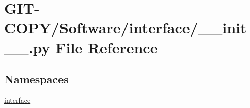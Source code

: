 \hypertarget{GIT-COPY_2Software_2interface_2____init_____8py}{}\section{G\+I\+T-\/\+C\+O\+P\+Y/\+Software/interface/\+\_\+\+\_\+init\+\_\+\+\_\+.py File Reference}
\label{GIT-COPY_2Software_2interface_2____init_____8py}
\subsection*{Namespaces}
\begin{DoxyCompactItemize}
\item 
 \hyperlink{namespaceinterface}{interface}
\end{DoxyCompactItemize}
